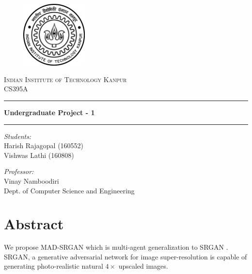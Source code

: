 \documentclass[12pt,a4paper,twocolumn]{article}
\begin{document}
    \begin{titlepage}
        \centering

        \vspace*{2cm}
        \begin{figure}[h]
            \centering
            \includegraphics[width=0.3\textwidth]{images/iitk-logo.png}\\[15mm]
        \end{figure}
        \textsc{\LARGE Indian Institute of Technology Kanpur}\\[1cm]
        {\Large CS395A}\\[7mm]

        \hrule
        \vspace{3mm}
        \textbf{\Large Undergraduate Project - 1}\\[5mm]
        \hrule
        \vspace{3mm}

        \begin{multicols}{2}
            \textit{Students:}\\[2mm]
            Harish Rajagopal (160552)\\
            Vishwas Lathi (160808)\\

            \vfill\null\columnbreak

            \textit{Professor:}\\[2mm]
            Vinay Namboodiri\\
            Dept. of Computer Science and Engineering
        \end{multicols}
    \end{titlepage}


    \section{Abstract}
        We propose MAD-SRGAN which is multi-agent generalization to SRGAN \cite{srgan}.
        SRGAN, a generative adversarial network \cite{gan} for image super-resolution is capable of generating photo-realistic natural $4\times$ upscaled images.
\end{document}

